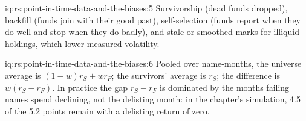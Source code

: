 \begin{solution}{iq:rs:point-in-time-data-and-the-biases:5}
Survivorship (dead funds dropped), backfill (funds join with their good past), self-selection (funds report when they do well
and stop when they do badly), and stale or smoothed marks for illiquid holdings, which lower measured volatility.
\end{solution}

\begin{solution}{iq:rs:point-in-time-data-and-the-biases:6}
Pooled over name-months, the universe average is $(1 - w)r_S + wr_F$; the survivors' average is $r_S$; the difference is $w(r_S
- r_F)$. In practice the gap $r_S - r_F$ is dominated by the months failing names spend declining, not the delisting month: in the
chapter's simulation, 4.5 of the 5.2 points remain with a delisting return of zero.
\end{solution}
